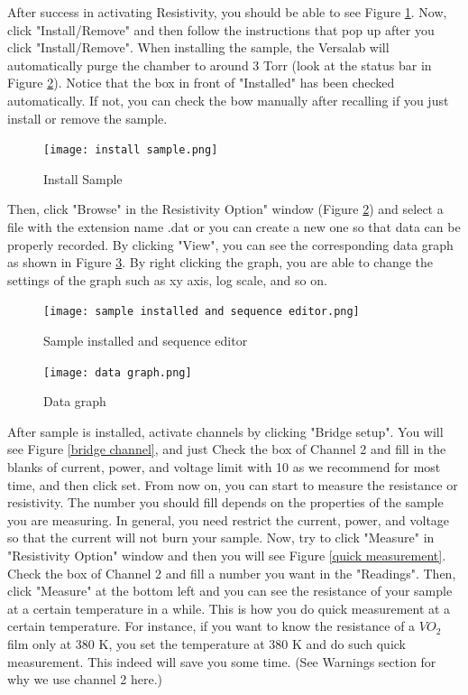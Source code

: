 \documentclass{article}
\begin{document}
        After success in activating Resistivity, you should be able to see Figure \ref{install sample}. Now, click "Install/Remove" and then follow the instructions that pop up after you click "Install/Remove". When installing the sample, the Versalab will automatically purge the chamber to around 3 Torr (look at the status bar in Figure \ref{Sample installed and sequence editor}). Notice that the box in front of "Installed" has been checked automatically. If not, you can check the bow manually after recalling if you just install or remove the sample.
        
        \begin{figure}[H]
            \centering
            \texttt{[image: install sample.png]}
            \caption{Install Sample}
            \label{install sample}
        \end{figure}

        Then, click "Browse" in the Resistivity Option" window (Figure \ref{Sample installed and sequence editor}) and select a file with the extension name .dat or you can create a new one so that data can be properly recorded. By clicking "View", you can see the corresponding data graph as shown in Figure \ref{Data graph}. By right clicking the graph, you are able to change the settings of the graph such as xy axis, log scale, and so on.
        
        \begin{figure}[H]
            \centering
            \texttt{[image: sample installed and sequence editor.png]}
            \caption{Sample installed and sequence editor}
            \label{Sample installed and sequence editor}
        \end{figure}

        \begin{figure}[H]
            \centering
            \texttt{[image: data graph.png]}
            \caption{Data graph}
            \label{Data graph}
        \end{figure}

        After sample is installed, activate channels by clicking "Bridge setup". You will see Figure \ref{bridge channel}, and just Check the box of Channel 2 and fill in the blanks of current, power, and voltage limit with 10 as we recommend for most time, and then click set. From now on, you can start to measure the resistance or resistivity. The number you should fill depends on the properties of the sample you are measuring. In general, you need restrict the current, power, and voltage so that the current will not burn your sample. Now, try to click "Measure" in "Resistivity Option" window and then you will see Figure \ref{quick measurement}. Check the box of Channel 2 and fill a number you want in the "Readings". Then, click "Measure" at the bottom left and you can see the resistance of your sample at a certain temperature in a while. This is how you do quick measurement at a certain temperature. For instance, if you want to know the resistance of a $VO_{2}$ film only at 380 K, you set the temperature at 380 K and do such quick measurement. This indeed will save you some time. (See Warnings section for why we use channel 2 here.)
        
\end{document}
